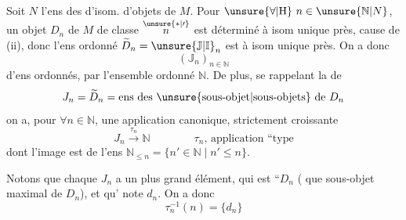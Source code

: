 
Soit \(N\) l'ens  des  d'isom. d'objets de \(M\). 
Pour \(\unsure{\forall|\mathrm H}\ n\in\unsure{\mathbb N|N}\), un objet \(D_n\) de \(M\) de classe \(\overset{\unsure{\ast|\prime}}{n}\) est déterminé à isom unique près,  cause de (ii), donc l'ens ordonné \(\widetilde D_n=\unsure{\mathbb J|\mathbb I}_n\) est  à isom unique près. On a donc  
\[
(\mathbb J_n)_{n\in\mathbb N}
\]
d'ens ordonnés,  par l'ensemble ordonné \(\mathbb N\).
De plus, se rappelant la  de
\[
 J_n=\widetilde D_n=\text{ens des \unsure{sous-objet|sous-objets} de }D_n
\]
on a, pour \(\forall n\in\mathbb N\), une application canonique, strictement croissante
\[
 J_n\xrightarrow{\tau_n}\mathbb N \qquad\qquad
 \text{\(\tau_n\), application ``type}
\]
dont l'image est   de l'ens
 \(\mathbb N_{\leq n}=\{n'\in\mathbb N\mid n'\leq n\}\).

Notons que chaque \(J_n\) a un plus grand élément, qui est ``\(D_n\) ( que  sous-objet maximal de \(D_n\)), et qu' note \(d_n\). On a donc 
\[
 \tau_n^{-1}(n)=\{d_n\}
\]

